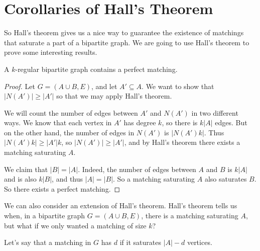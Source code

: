 \documentclass[a4paper]{scrreprt}
\begin{document}



\section{Corollaries of Hall's Theorem}

So Hall's theorem gives us a nice way to guarantee the existence of matchings that saturate a part of a bipartite graph. We are going to use Hall's theorem to prove some interesting results.


\begin{corollary}
	A $k$-regular bipartite graph contains a perfect matching.
\end{corollary}
\begin{proof}
	Let $G = (A \cup B, E)$, and let $A' \subseteq A$. We want to show that $|N(A')| \geq |A'|$ so that we may apply Hall's theorem.

	We will count the number of edges between $A'$ and $N(A')$ in two different ways. We know that each vertex in $A'$ has degree $k$, so there is $k|A|$ edges. But on the other hand, the number of edges in $N(A')$ is $|N(A')k|$. Thus $|N(A')k| \geq |A'|k$, so $|N(A')| \geq |A'|$, and by Hall's theorem
	there exists a matching saturating $A$.

	We claim that $|B| = |A|$. Indeed, the number of edges between $A$ and $B$ is $k|A|$ and is also $k|B|$, and thus $|A| = |B|$. So a matching saturating $A$ also saturates $B$. So there exists a perfect matching.
\end{proof}

We can also consider an extension of Hall's theorem. Hall's theorem tells us when, in a bipartite graph $G = (A \cup B, E)$, there is a matching saturating $A$, but what if we only wanted a matching of size $k$?

Let's say that a matching in $G$ has  $d$ if it saturates $|A| - d$ vertices. 
\end{document}
